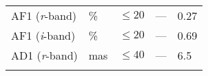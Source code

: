 \begin{longtable}[]{@{}lllll@{}}
\begin{minipage}[t]{0.19\columnwidth}\raggedright\strut
AF1 (\emph{r}-band)\strut
\end{minipage} & \begin{minipage}[t]{0.08\columnwidth}\raggedright\strut
\%\strut
\end{minipage} & \begin{minipage}[t]{0.20\columnwidth}\raggedright\strut
\(\leq 20\)\strut
\end{minipage} & \begin{minipage}[t]{0.22\columnwidth}\raggedright\strut
---\strut
\end{minipage} & \begin{minipage}[t]{0.17\columnwidth}\raggedright\strut
0.27\strut
\end{minipage}\tabularnewline
\begin{minipage}[t]{0.19\columnwidth}\raggedright\strut
AF1 (\emph{i}-band)\strut
\end{minipage} & \begin{minipage}[t]{0.08\columnwidth}\raggedright\strut
\%\strut
\end{minipage} & \begin{minipage}[t]{0.20\columnwidth}\raggedright\strut
\(\leq 20\)\strut
\end{minipage} & \begin{minipage}[t]{0.22\columnwidth}\raggedright\strut
---\strut
\end{minipage} & \begin{minipage}[t]{0.17\columnwidth}\raggedright\strut
0.69\strut
\end{minipage}\tabularnewline
\begin{minipage}[t]{0.19\columnwidth}\raggedright\strut
AD1 (\emph{r}-band)\strut
\end{minipage} & \begin{minipage}[t]{0.08\columnwidth}\raggedright\strut
mas\strut
\end{minipage} & \begin{minipage}[t]{0.20\columnwidth}\raggedright\strut
\(\leq 40\)\strut
\end{minipage} & \begin{minipage}[t]{0.22\columnwidth}\raggedright\strut
---\strut
\end{minipage} & \begin{minipage}[t]{0.17\columnwidth}\raggedright\strut
6.5\strut
\end{minipage}\tabularnewline
\begin{minipage}[t]{0.19\columnwidth}\raggedright\strut

\end{minipage}
\end{longtable}
